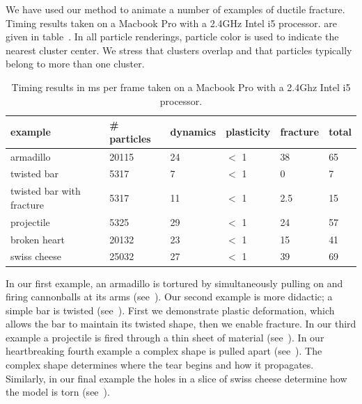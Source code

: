 \documentclass[review]{acmsiggraph}
\begin{document}
We have used our method to animate a number of examples of ductile fracture.  Timing results
taken on a Macbook Pro with a 2.4GHz Intel i5 processor.
are given in table~.
In all particle renderings, particle color is used to indicate the nearest cluster center.  
We stress that clusters overlap and that particles typically belong to more than one cluster.

\begin{table}
\begin{center}
\caption{Timing results in ms per frame taken on a Macbook Pro with a 2.4Ghz Intel i5 processor.}
\label{table:timing}
\begin{tabular}{|l|l|l|l|l|l|}
\hline
example & \# particles & dynamics & plasticity & fracture & total\\
\hline
armadillo & 20115 & 24  & $<$ 1 & 38 & 65\\
twisted bar & 5317 & 7 & $<$ 1  & 0 & 7\\
twisted bar with fracture & 5317 & 11  & $<$ 1 & 2.5 & 15 \\
projectile & 5325 & 29 & $<$ 1 & 24 & 57\\
broken heart & 20132 & 23 & $<$ 1 & 15 & 41\\
swiss cheese & 25032 & 27 & $<$ 1 & 39 & 69 \\
\hline
\end{tabular}
\end{center}
\end{table}

In our first example, an armadillo is tortured by simultaneously pulling on and firing
cannonballs at its arms (see~).
Our second example is more didactic; a simple bar is twisted (see~).  First we demonstrate 
plastic deformation, which allows the bar to maintain its twisted shape, then we enable fracture. 
In our third example a projectile is fired through a thin sheet of material (see~).  
In our heartbreaking fourth example a complex shape is pulled apart (see~).  The complex shape determines
where the tear begins and how it propagates.  Similarly, in our final example the holes in a 
slice of swiss cheese determine how the model is torn (see~).


\end{document}
